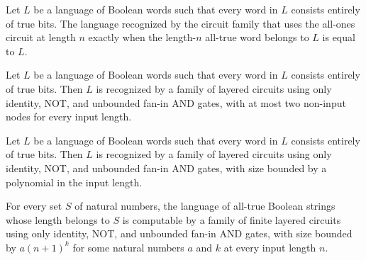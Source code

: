 \begin{theorem}
\label{BoolCircuit.unaryFamily_language}
\leanok
{}
Let $L$ be a language of Boolean words such that every word in $L$ consists entirely of
true bits. The language recognized by the circuit family that uses the all-ones circuit
at length $n$ exactly when the length-$n$ all-true word belongs to $L$ is equal to $L$.
\end{theorem}

\begin{theorem}
\label{Language.inLayeredSIZE_two_of_le_allOnes}
\leanok
{}
Let $L$ be a language of Boolean words such that every word in $L$ consists entirely of
true bits. Then $L$ is recognized by a family of layered circuits using only identity,
NOT, and unbounded fan-in AND gates, with at most two non-input nodes for every input
length.
\end{theorem}

\begin{theorem}
\label{Language.inLayeredPPoly_of_le_allOnes}
\leanok
{}
Let $L$ be a language of Boolean words such that every word in $L$ consists entirely of
true bits. Then $L$ is recognized by a family of layered circuits using only identity,
NOT, and unbounded fan-in AND gates, with size bounded by a polynomial in the input
length.
\end{theorem}

\begin{theorem}
\label{Language.unary_inLayeredPPoly}
\leanok
{}
For every set $S$ of natural numbers, the language of all-true Boolean strings whose
length belongs to $S$ is computable by a family of finite layered circuits using only
identity, NOT, and unbounded fan-in AND gates, with size bounded by $a(n+1)^k$ for some
natural numbers $a$ and $k$ at every input length $n$.
\end{theorem}

